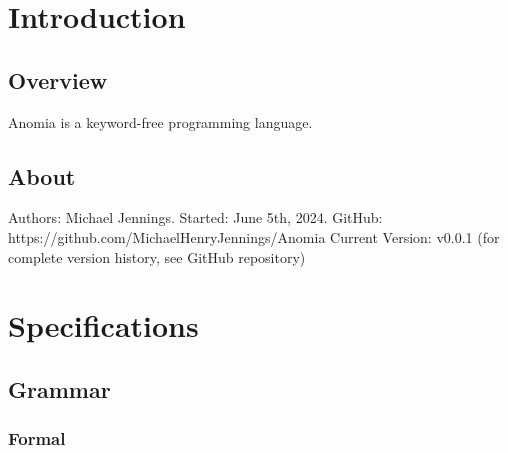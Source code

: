 \documentclass[12pt,letterpaper]{article}
\begin{document}
\section[0]{Introduction}

\subsection[0]{Overview}
Anomia is a keyword-free programming language.

\subsection[1]{About}
Authors: Michael Jennings. \newline
Started: June 5th, 2024. \newline
GitHub: https://github.com/MichaelHenryJennings/Anomia \newline
Current Version: v0.0.1 (for complete version history, see GitHub repository)

\section[1]{Specifications}



\subsection[0]{Grammar}

\subsubsection[0]{Formal}
\end{document}
